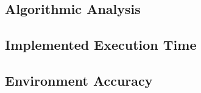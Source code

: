 \subsection{Algorithmic Analysis}

\subsection{Implemented Executi{}on Time}
\subsection{Environment Accuracy}